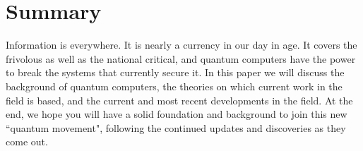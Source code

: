\documentclass[11pt]{article}
\begin{document}
\renewcommand{\familydefault}{\rmdefault}




\section*{Summary}
Information is everywhere. It is nearly a currency in our day in age. It covers the frivolous as well as the national critical, and quantum computers have the power to break the systems that currently secure it. In this paper we will discuss the background of quantum computers, the theories on which current work in the field is based, and the current and most recent developments in the field. At the end, we hope you will have a solid foundation and background to join this new ``quantum movement", following the continued updates and discoveries as they come out. 
\pagebreak

\tableofcontents
\pagebreak








\pagebreak\pagebreak

\fontsize{9}{12}\selectfont{}
\singlespacing

\pagebreak
\printbibliography
\end{document}
